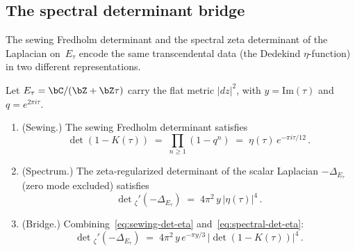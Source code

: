\subsection{The spectral determinant bridge}%
\label{subsec:spectral-determinant-bridge}%
%

The sewing Fredholm determinant and the spectral zeta
determinant of the Laplacian on~$E_\tau$ encode the same
transcendental data (the Dedekind $\eta$-function) in two
different representations.

\begin{proposition}%
\label{prop:sewing-spectral-bridge}%
\ClaimStatusProvedHere%
%
Let $E_\tau = \bC/(\bZ+\bZ\tau)$ carry the flat metric
$\lvert dz\rvert^2$, with $y = \mathrm{Im}(\tau)$ and
$q = e^{2\pi i\tau}$.
\begin{enumerate}[label=\textup{(\roman*)}]
\item \textup{(}Sewing.\textup{)}
 The sewing Fredholm determinant satisfies
 \begin{equation}\label{eq:sewing-det-eta}
 \det(1-K(\tau))
 \;=\;
 \prod_{n\ge1}(1-q^n)
 \;=\;
 \eta(\tau)\,e^{-\pi i\tau/12}\,.
 \end{equation}
\item \textup{(}Spectrum.\textup{)}
 The zeta-regularized determinant of the scalar Laplacian
 $-\Delta_{E_\tau}$ \textup{(}zero mode excluded\textup{)}
 satisfies
 \begin{equation}\label{eq:spectral-det-eta}
 \det{}_\zeta'\!(-\Delta_{E_\tau})
 \;=\;
 4\pi^2\,y\,\lvert\eta(\tau)\rvert^4\,.
 \end{equation}
\item \textup{(}Bridge.\textup{)}
 Combining~\eqref{eq:sewing-det-eta}
 and~\eqref{eq:spectral-det-eta}:
 \begin{equation}\label{eq:sewing-spectral-bridge}
 \det{}_\zeta'\!(-\Delta_{E_\tau})
 \;=\;
 4\pi^2\,y\,e^{-\pi y/3}\,
 \lvert\det(1-K(\tau))\rvert^4\,.
 \end{equation}
\end{enumerate}
\end{proposition}


